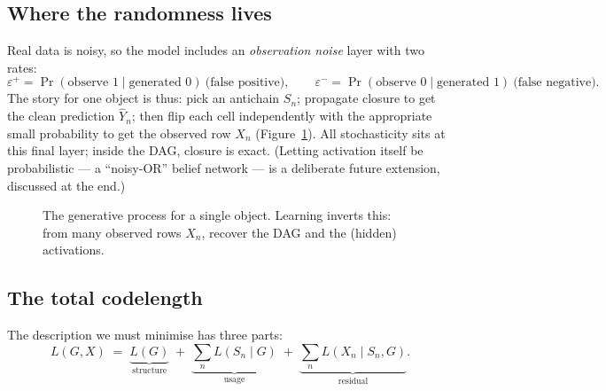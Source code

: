 \documentclass[11pt]{article}
\newcommand{\CL}{L}                       %
\newcommand{\Yhat}{\hat{Y}}
\newcommand{\epsp}{\varepsilon^{+}}
\newcommand{\epsm}{\varepsilon^{-}}
\begin{document}
\subsection{Where the randomness lives}

Real data is noisy, so the model includes an \emph{observation noise} layer with
two rates:
\[
  \epsp = \Pr(\text{observe }1 \mid \text{generated }0)\ \text{(false positive)},\qquad
  \epsm = \Pr(\text{observe }0 \mid \text{generated }1)\ \text{(false negative)}.
\]
The story for one object is thus: pick an antichain $S_n$; propagate closure to
get the clean prediction $\Yhat_n$; then flip each cell independently with the
appropriate small probability to get the observed row $X_n$
(Figure~\ref{fig:generate}). All stochasticity sits at this final layer; inside
the DAG, closure is exact. (Letting activation itself be probabilistic --- a
``noisy-OR'' belief network --- is a deliberate future extension, discussed at
the end.)

\begin{figure}[h]
\centering
{}
\caption{The generative process for a single object. Learning inverts this:
from many observed rows $X_n$, recover the DAG and the (hidden) activations.}
\label{fig:generate}
\end{figure}

\subsection{The total codelength}

The description we must minimise has three parts:
\begin{equation}
\CL(G,X)\;=\;\underbrace{\CL(G)}_{\text{structure}}
\;+\;\underbrace{\textstyle\sum_n \CL(S_n\mid G)}_{\text{usage}}
\;+\;\underbrace{\textstyle\sum_n \CL(X_n\mid S_n,G)}_{\text{residual}} .
\label{eq:decomp}
\end{equation}
\end{document}
